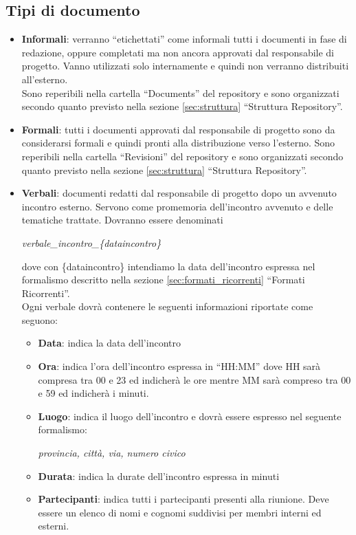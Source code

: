 \subsection{Tipi di documento}
\begin{itemize}
\item \textbf{Informali}: verranno ``etichettati'' come informali tutti i documenti in fase di redazione, oppure completati ma non ancora approvati dal responsabile di progetto. Vanno utilizzati solo internamente e quindi non verranno distribuiti all'esterno.\\
Sono reperibili nella cartella ``Documents'' del repository e sono organizzati secondo quanto previsto nella sezione \ref{sec:struttura} ``Struttura Repository''.
\item \textbf{Formali}: tutti i documenti approvati dal responsabile di progetto sono da considerarsi formali e quindi pronti alla distribuzione verso l'esterno. Sono reperibili nella cartella ``Revisioni'' del repository e sono organizzati secondo quanto previsto nella sezione \ref{sec:struttura} ``Struttura Repository''.
\item \textbf{Verbali}: documenti redatti dal responsabile di progetto dopo un avvenuto incontro esterno. Servono come promemoria dell'incontro avvenuto e delle tematiche trattate. Dovranno essere denominati
\begin{center}
\textit{verbale\_incontro\_\{dataincontro\}}
\end{center}
dove con \{dataincontro\} intendiamo la data dell'incontro espressa nel formalismo descritto nella sezione \ref{sec:formati_ricorrenti} ``Formati Ricorrenti''.\\
Ogni verbale dovrà contenere le seguenti informazioni riportate come seguono:
\begin{itemize}
\item \textbf{Data}: indica la data dell'incontro
\item \textbf{Ora}: indica l'ora dell'incontro espressa in ``HH:MM'' dove HH sarà compresa tra 00 e 23 ed indicherà le ore mentre MM sarà compreso tra 00 e 59 ed indicherà i minuti. 
\item \textbf{Luogo}: indica il luogo dell'incontro e dovrà essere espresso nel seguente formalismo:
\begin{center}
\textit{provincia, città, via, numero civico}
\end{center}
\item \textbf{Durata}: indica la durate dell'incontro espressa in minuti
\item \textbf{Partecipanti}: indica tutti i partecipanti presenti alla riunione. Deve essere un elenco di nomi e cognomi suddivisi per membri interni ed esterni.

\end{itemize}
\end{itemize}
